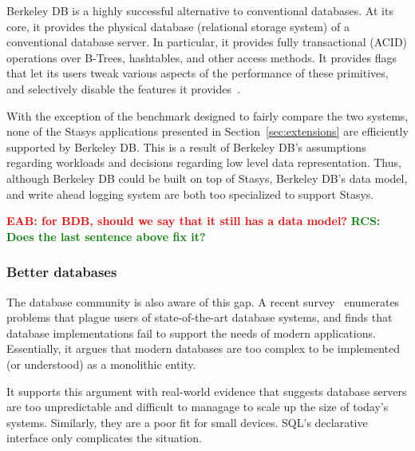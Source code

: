 \documentclass[letterpaper,twocolumn,10pt]{article}
\newcommand{\yad}{Stasys\xspace}
\newcommand{\eab}[1]{\textcolor{red}{\bf EAB: #1}}
\newcommand{\rcs}[1]{\textcolor{green}{\bf RCS: #1}}
\begin{document}

Berkeley DB is a highly successful alternative to conventional
databases.  At its core, it provides the physical database
(relational storage system) of a conventional database server.
In particular, 
it provides fully transactional (ACID) operations over B-Trees, 
hashtables, and other access methods.  It provides flags that 
let its users tweak various aspects of the performance of these
primitives, and selectively disable the features it provides~\cite{libtp}.

With the
exception of the benchmark designed to fairly compare the two systems, none of the \yad 
applications presented in Section~\ref{sec:extensions} are efficiently
supported by Berkeley DB.   This is a result of Berkeley DB's  
assumptions regarding workloads and decisions regarding low level data
representation.  Thus, although Berkeley DB could be built on top of \yad,
Berkeley DB's data model, and write ahead logging system are both too specialized to support \yad.

\eab{for BDB, should we say that it still has a data model?} \rcs{ Does the last sentence above fix it?}




\subsubsection{Better databases}

The database community is also aware of this gap. 
A recent survey~\cite{riscDB} enumerates problems that plague users of
state-of-the-art database systems, and finds that database implementations fail to support the
needs of modern applications.  Essentially, it argues that modern 
databases are too complex to be implemented (or understood) 
as a monolithic entity.

It supports this argument with real-world evidence that suggests
database servers are too unpredictable and difficult to managage to
scale up the size of today's systems.  Similarly, they are a poor fit
for small devices.  SQL's declarative interface only complicates the
situation.
\end{document}
